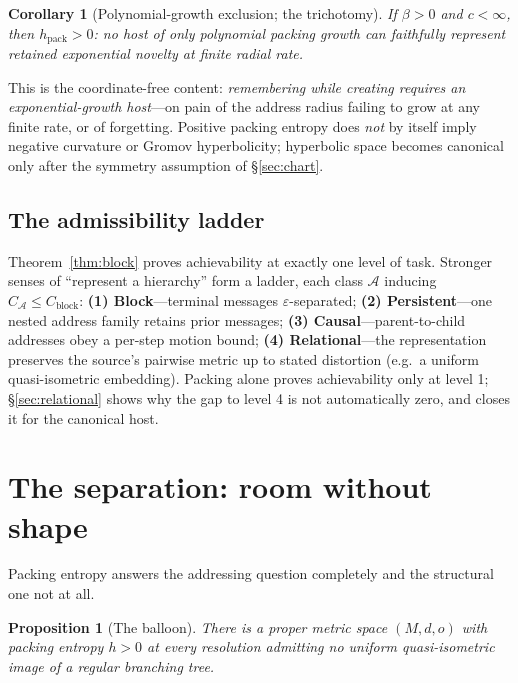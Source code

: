 \documentclass[11pt,reqno]{amsart}
\theoremstyle{plain}
\newtheorem{proposition}[theorem]{Proposition}
\newtheorem{corollary}[theorem]{Corollary}
\theoremstyle{definition}
\newcommand{\hpack}{h_{\mathrm{pack}}}
\newcommand{\Cblock}{C_{\mathrm{block}}}
\newcommand{\eps}{\varepsilon}
\begin{document}
\begin{corollary}[Polynomial-growth exclusion; the trichotomy]\label{cor:poly}
If $\beta>0$ and $c<\infty$, then $\hpack>0$: no host of only polynomial packing growth can faithfully represent retained exponential novelty at finite radial rate.
\end{corollary}

This is the coordinate-free content: \emph{remembering while creating requires an exponential-growth host}---on pain of the address radius failing to grow at any finite rate, or of forgetting. Positive packing entropy does \emph{not} by itself imply negative curvature or Gromov hyperbolicity; hyperbolic space becomes canonical only after the symmetry assumption of \S\ref{sec:chart}.

\subsection{The admissibility ladder}\label{sec:ladder}

Theorem~\ref{thm:block} proves achievability at exactly one level of task. Stronger senses of ``represent a hierarchy'' form a ladder, each class $\mathcal A$ inducing $C_{\mathcal A}\le\Cblock$: \textbf{(1) Block}---terminal messages $\eps$-separated; \textbf{(2) Persistent}---one nested address family retains prior messages; \textbf{(3) Causal}---parent-to-child addresses obey a per-step motion bound; \textbf{(4) Relational}---the representation preserves the source's pairwise metric up to stated distortion (e.g.\ a uniform quasi-isometric embedding). Packing alone proves achievability only at level 1; \S\ref{sec:relational} shows why the gap to level 4 is not automatically zero, and closes it for the canonical host.

\section{The separation: room without shape}\label{sec:balloon}

Packing entropy answers the addressing question completely and the structural one not at all.

\begin{proposition}[The balloon]\label{prop:balloon}
There is a proper metric space $(M,d,o)$ with packing entropy $h>0$ at every resolution admitting no uniform quasi-isometric image of a regular branching tree.
\end{proposition}
\end{document}
